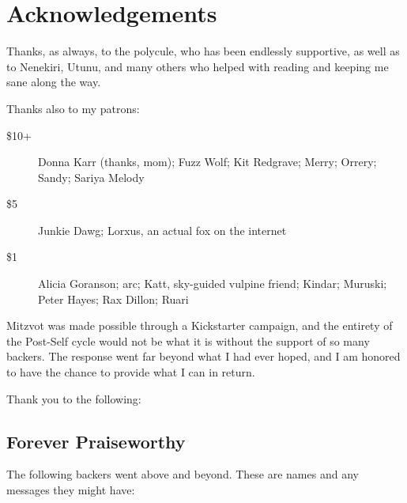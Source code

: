 \chapter*{Acknowledgements}

Thanks, as always, to the polycule, who has been endlessly supportive, as well as to Nenekiri, Utunu, and many others who helped with reading and keeping me sane along the way.

Thanks also to my patrons:

\begin{description}
    \item[\$10+]
    Donna Karr (thanks, mom); Fuzz Wolf; Kit Redgrave; Merry; Orrery; Sandy; Sariya Melody

    \item[\$5]
    Junkie Dawg; Lorxus, an actual fox on the internet

    \item[\$1]
    Alicia Goranson; arc; Katt, sky-guided vulpine friend; Kindar; Muruski; Peter Hayes; Rax Dillon; Ruari
\end{description}

Mitzvot was made possible through a Kickstarter campaign, and the entirety of the Post-Self cycle would not be what it is without the support of so many backers. The response went far beyond what I had ever hoped, and I am honored to have the chance to provide what I can in return.

Thank you to the following:

\section*{Forever Praiseworthy}

The following backers went above and beyond. These are names and any messages they might have:


